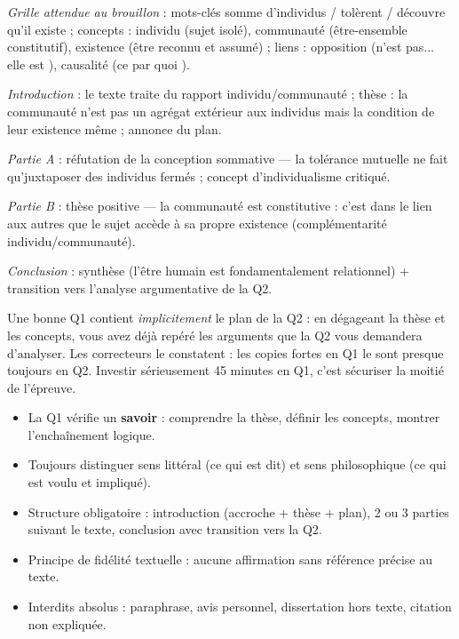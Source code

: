 \documentclass[11pt]{article}
\newcommand{\cle}[1]{{\popxbold\color{popdark}#1}}
\begin{document}
\begin{corrige}[Exercice]
\emph{Grille attendue au brouillon} : mots-clés \og somme d'individus \fg / \og tolèrent \fg / \og découvre qu'il existe \fg ; concepts : \cle{individu} (sujet isolé), \cle{communauté} (être-ensemble constitutif), \cle{existence} (être reconnu et assumé) ; liens : opposition (\og n'est pas... elle est \fg), causalité (\og ce par quoi \fg).

\emph{Introduction} : le texte traite du rapport individu/communauté ; thèse : la communauté n'est pas un agrégat extérieur aux individus mais la condition de leur existence même ; annonce du plan.

\emph{Partie A} : réfutation de la conception sommative — la tolérance mutuelle ne fait qu'juxtaposer des individus fermés ; concept d'individualisme critiqué.

\emph{Partie B} : thèse positive — la communauté est constitutive : c'est dans le lien aux autres que le sujet accède à sa propre existence (complémentarité individu/communauté).

\emph{Conclusion} : synthèse (l'être humain est fondamentalement relationnel) + transition vers l'analyse argumentative de la Q2.
\end{corrige}

\begin{savaistu}
Une bonne Q1 contient \emph{implicitement} le plan de la Q2 : en dégageant la thèse et les concepts, vous avez déjà repéré les arguments que la Q2 vous demandera d'analyser. Les correcteurs le constatent : les copies fortes en Q1 le sont presque toujours en Q2. Investir sérieusement 45 minutes en Q1, c'est sécuriser la moitié de l'épreuve.
\end{savaistu}

\begin{aretenir}
\begin{itemize}
\item La Q1 vérifie un \textbf{savoir} : comprendre la thèse, définir les concepts, montrer l'enchaînement logique.
\item Toujours distinguer \cle{sens littéral} (ce qui est dit) et \cle{sens philosophique} (ce qui est voulu et impliqué).
\item Structure obligatoire : introduction (accroche + thèse + plan), 2 ou 3 parties suivant le texte, conclusion avec transition vers la Q2.
\item Principe de fidélité textuelle : aucune affirmation sans référence précise au texte.
\item Interdits absolus : paraphrase, avis personnel, dissertation hors texte, citation non expliquée.
\end{itemize}
\end{aretenir}
\end{document}

